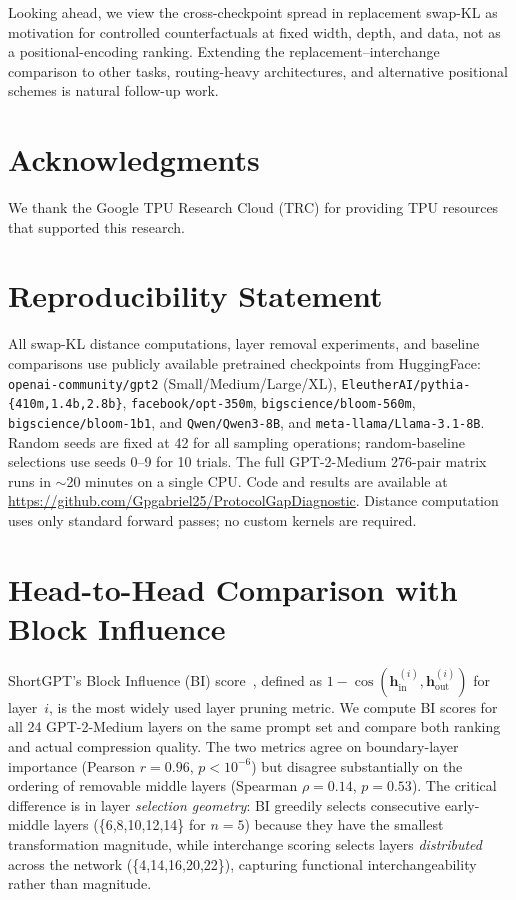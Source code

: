 \documentclass{article}
\begin{document}
Looking ahead, we view the cross-checkpoint spread in replacement swap-KL as motivation for controlled counterfactuals at fixed width, depth, and data, not as a positional-encoding ranking. Extending the replacement--interchange comparison to other tasks, routing-heavy architectures, and alternative positional schemes is natural follow-up work.

\section*{Acknowledgments}
We thank the Google TPU Research Cloud (TRC) for providing TPU resources that supported this research.

\section*{Reproducibility Statement}
\label{sec:reproducibility}
All swap-KL distance computations, layer removal experiments, and baseline comparisons use publicly available pretrained checkpoints from HuggingFace: \texttt{openai-community/gpt2} (Small/Medium/Large/XL), \texttt{EleutherAI/pythia-\{410m,1.4b,2.8b\}}, \texttt{facebook/opt-350m}, \texttt{bigscience/bloom-560m}, \texttt{bigscience/bloom-1b1}, and \texttt{Qwen/Qwen3-8B}, and \texttt{meta-llama/Llama-3.1-8B}. Random seeds are fixed at 42 for all sampling operations; random-baseline selections use seeds 0--9 for 10 trials. The full GPT-2-Medium 276-pair matrix runs in ${\sim}$20 minutes on a single CPU. Code and results are available at \url{https://github.com/Gpgabriel25/ProtocolGapDiagnostic}. Distance computation uses only standard forward passes; no custom kernels are required.




\appendix



\section{Head-to-Head Comparison with Block Influence}
\label{sec:app_bi_comparison}

ShortGPT's Block Influence (BI) score~\citep{men2024shortgpt}, defined as $1-\cos(\mathbf{h}^{(i)}_{\text{in}}, \mathbf{h}^{(i)}_{\text{out}})$ for layer~$i$, is the most widely used layer pruning metric. We compute BI scores for all 24 GPT-2-Medium layers on the same prompt set and compare both ranking and actual compression quality. The two metrics agree on boundary-layer importance (Pearson $r{=}0.96$, $p{<}10^{-6}$) but disagree substantially on the ordering of removable middle layers (Spearman $\rho{=}0.14$, $p{=}0.53$). The critical difference is in layer \emph{selection geometry}: BI greedily selects consecutive early-middle layers (\{6,8,10,12,14\} for $n{=}5$) because they have the smallest transformation magnitude, while interchange scoring selects layers \emph{distributed} across the network (\{4,14,16,20,22\}), capturing functional interchangeability rather than magnitude.
\end{document}
